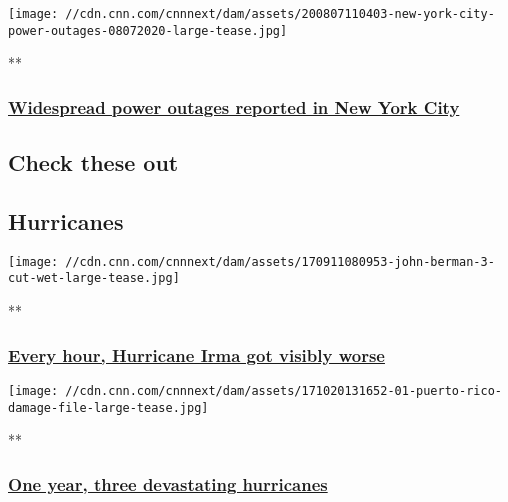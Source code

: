 \texttt{[image: //cdn.cnn.com/cnnnext/dam/assets/200807110403-new-york-city-power-outages-08072020-large-tease.jpg]}

**

\hypertarget{widespread-power-outages-reported-in-new-york-city}{%
\subsubsection{\texorpdfstring{\href{/videos/us/2020/08/07/new-york-city-power-outages-es-ldn-vpx.cnn}{Widespread
power outages reported in New York
City}}{Widespread power outages reported in New York City}}\label{widespread-power-outages-reported-in-new-york-city}}

\hypertarget{check-these-out-}{%
\subsection{Check these out~}\label{check-these-out-}}

\hypertarget{hurricanes}{%
\subsection{Hurricanes}\label{hurricanes}}

\href{/videos/politics/2017/09/10/hurricane-irma-berman-timeline-orig-alee.cnn}{}

\texttt{[image: //cdn.cnn.com/cnnnext/dam/assets/170911080953-john-berman-3-cut-wet-large-tease.jpg]}

**

\hypertarget{every-hour-hurricane-irma-got-visibly-worse}{%
\subsubsection{\texorpdfstring{\href{/videos/politics/2017/09/10/hurricane-irma-berman-timeline-orig-alee.cnn}{Every
hour, Hurricane Irma got visibly
worse}}{Every hour, Hurricane Irma got visibly worse}}\label{every-hour-hurricane-irma-got-visibly-worse}}

\href{/videos/us/2017/11/30/hurricane-season-2017-recap-vstan-orig-js-lh.cnn}{}

\texttt{[image: //cdn.cnn.com/cnnnext/dam/assets/171020131652-01-puerto-rico-damage-file-large-tease.jpg]}

**

\hypertarget{one-year-three-devastating-hurricanes}{%
\subsubsection{\texorpdfstring{\href{/videos/us/2017/11/30/hurricane-season-2017-recap-vstan-orig-js-lh.cnn}{One
year, three devastating
hurricanes}}{One year, three devastating hurricanes}}\label{one-year-three-devastating-hurricanes}}

